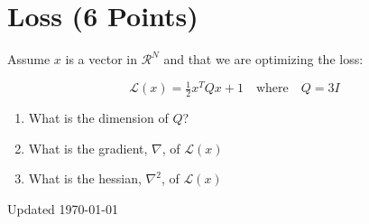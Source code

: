 \documentclass[]{article}
\begin{document}
\newpage
\section{Loss (6 Points)}
    Assume $x$ is a vector in $\mathcal{R}^N$ and that we are optimizing the loss:

\begin{tcolorbox}[left=14pt, arc=0pt, outer arc=0pt, colframe=blue!5, colback=blue!5]
    $$\mathcal{L}(x) = \tfrac{1}{2}x^TQx + 1 \quad \text{where} \quad Q = 3I$$
\end{tcolorbox}

\begin{enumerate}[label=(\alph*)]
    \item What is the dimension of $Q$?
    \item What is the gradient, $\nabla$, of $\mathcal{L}(x)$
    \item What is the hessian, $\nabla^2$, of $\mathcal{L}(x)$
\end{enumerate}






\vfill
\begin{tiny}Updated \today \end{tiny}
\end{document}
